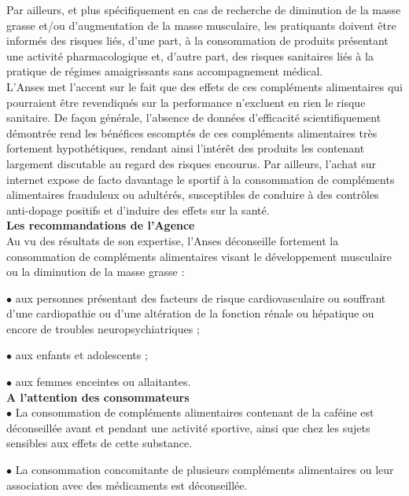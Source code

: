 \documentclass[8pt]{article}
\begin{document}
Par ailleurs, et plus spécifiquement en cas de recherche de diminution de la masse grasse et/ou d’augmentation de la masse musculaire, les pratiquants doivent être informés des risques liés, d’une part, à la consommation de produits présentant une activité pharmacologique et, d’autre part, des risques sanitaires liés à la pratique de régimes amaigrissants sans accompagnement médical.\\

L’Anses met l’accent sur le fait que des effets de ces compléments alimentaires qui pourraient être revendiqués sur la performance n’excluent en rien le risque sanitaire. De façon générale, l’absence de données d’efficacité scientifiquement démontrée rend les bénéfices escomptés de ces compléments alimentaires très fortement hypothétiques, rendant ainsi l’intérêt des produits les contenant largement discutable au regard des risques encourus. Par ailleurs, l’achat sur internet expose de facto davantage le sportif à la consommation de compléments alimentaires frauduleux ou adultérés, susceptibles de conduire à des contrôles anti-dopage positifs et d’induire des effets sur la santé.\\

\textbf{Les recommandations de l’Agence}\\

Au vu des résultats de son expertise, l’Anses déconseille fortement la consommation de compléments alimentaires visant le développement musculaire ou la diminution de la masse grasse :

	$\bullet$ aux personnes présentant des facteurs de risque cardiovasculaire ou souffrant d’une cardiopathie ou d’une altération de la fonction rénale ou hépatique ou encore de troubles neuropsychiatriques ;
	
	$\bullet$  aux enfants et adolescents ;
	
	$\bullet$ aux femmes enceintes ou allaitantes.\\


\textbf{A l’attention des consommateurs}\\

	$\bullet$ La consommation de compléments alimentaires contenant de la caféine est déconseillée avant et pendant une activité sportive, ainsi que chez les sujets sensibles aux effets de cette substance.
	
	$\bullet$ La consommation concomitante de plusieurs compléments alimentaires ou leur association avec des médicaments est déconseillée.
	
\end{document}

